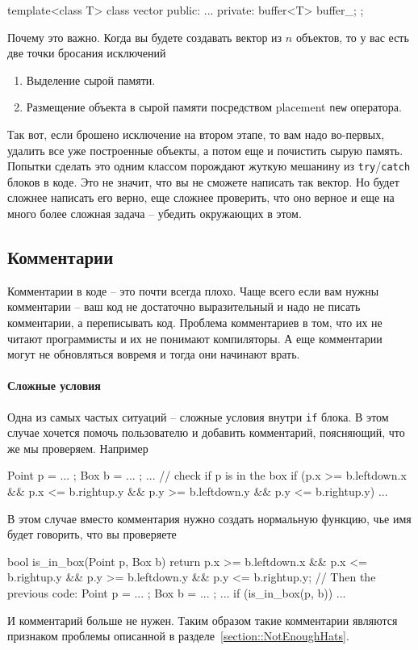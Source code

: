 \begin{enumerate}
\begin{cppcode}
template<class T>
class vector {
public:
  ...
private:
  buffer<T> buffer_;
};
\end{cppcode}
Почему это важно.
Когда вы будете создавать вектор из $n$ объектов, то у вас есть две точки бросания исключений
\begin{enumerate}
\item Выделение сырой памяти.

\item Размещение объекта в сырой памяти посредством placement \verb"new" оператора.
\end{enumerate}
Так вот, если брошено исключение на втором этапе, то вам надо во-первых, удалить все уже построенные объекты, а потом еще и почистить сырую память.
Попытки сделать это одним классом порождают жуткую мешанину из \verb"try"/\verb"catch" блоков в коде.
Это не значит, что вы не сможете написать так вектор.
Но будет сложнее написать его верно, еще сложнее проверить, что оно верное и еще на много более сложная задача -- убедить окружающих в этом.
\end{enumerate}

\subsection{Комментарии}

Комментарии в коде -- это почти всегда плохо.
Чаще всего если вам нужны комментарии -- ваш код не достаточно выразительный и надо не писать комментарии, а переписывать код.
Проблема комментариев в том, что их не читают программисты и их не понимают компиляторы.
А еще комментарии могут не обновляться вовремя и тогда они начинают врать.

\paragraph{Сложные условия}

Одна из самых частых ситуаций -- сложные условия внутри \verb"if" блока.
В этом случае хочется помочь пользователю и добавить комментарий, поясняющий, что же мы проверяем.
Например
\begin{cppcode}
Point p = ... ;
Box b = ... ;
...
// check if p is in the box
if (p.x >= b.leftdown.x && p.x <= b.rightup.y && p.y >= b.leftdown.y && p.y <= b.rightup.y) {
  ...
}
\end{cppcode}
В этом случае вместо комментария нужно создать нормальную функцию, чье имя будет говорить, что вы проверяете
\begin{cppcode}
bool is_in_box(Point p, Box b) {
  return p.x >= b.leftdown.x && p.x <= b.rightup.y && p.y >= b.leftdown.y && p.y <= b.rightup.y;
}
// Then the previous code:
Point p = ... ;
Box b = ... ;
...
if (is_in_box(p, b)) {
  ...
}
\end{cppcode}
И комментарий больше не нужен.
Таким образом такие комментарии являются признаком проблемы описанной в разделе~\ref{section::NotEnoughHats}.

